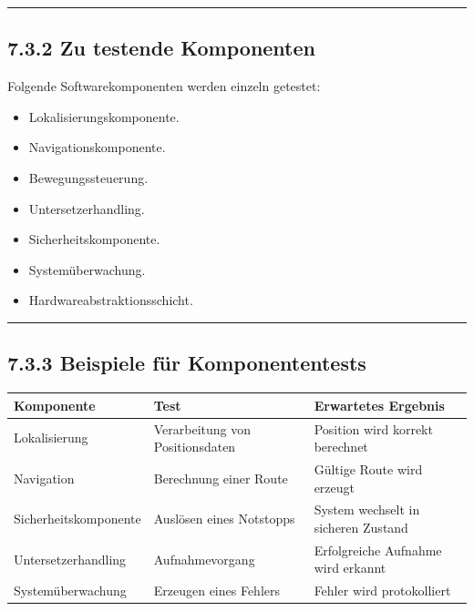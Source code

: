 \documentclass[
]{article}
\providecommand{\tightlist}{%
  \setlength{\itemsep}{0pt}\setlength{\parskip}{0pt}}
\begin{document}
\begin{center}\rule{0.5\linewidth}{0.5pt}\end{center}

\subsection{7.3.2 Zu testende
Komponenten}\label{zu-testende-komponenten}

Folgende Softwarekomponenten werden einzeln getestet:

\begin{itemize}
\tightlist
\item
  Lokalisierungskomponente.
\item
  Navigationskomponente.
\item
  Bewegungssteuerung.
\item
  Untersetzerhandling.
\item
  Sicherheitskomponente.
\item
  Systemüberwachung.
\item
  Hardwareabstraktionsschicht.
\end{itemize}

\begin{center}\rule{0.5\linewidth}{0.5pt}\end{center}

\subsection{7.3.3 Beispiele für
Komponententests}\label{beispiele-fuxfcr-komponententests}

\begin{longtable}[]{@{}
  >{\raggedright\arraybackslash}p{}
  >{\raggedright\arraybackslash}p{}
  >{\raggedright\arraybackslash}p{}@{}}
\toprule\noalign{}
\begin{minipage}[b]{\linewidth}\raggedright
Komponente
\end{minipage} & \begin{minipage}[b]{\linewidth}\raggedright
Test
\end{minipage} & \begin{minipage}[b]{\linewidth}\raggedright
Erwartetes Ergebnis
\end{minipage} \\
\midrule\noalign{}
\endhead
\bottomrule\noalign{}
\endlastfoot
Lokalisierung & Verarbeitung von Positionsdaten & Position wird korrekt
berechnet \\
Navigation & Berechnung einer Route & Gültige Route wird erzeugt \\
Sicherheitskomponente & Auslösen eines Notstopps & System wechselt in
sicheren Zustand \\
Untersetzerhandling & Aufnahmevorgang & Erfolgreiche Aufnahme wird
erkannt \\
Systemüberwachung & Erzeugen eines Fehlers & Fehler wird
protokolliert \\
\end{longtable}
\end{document}
